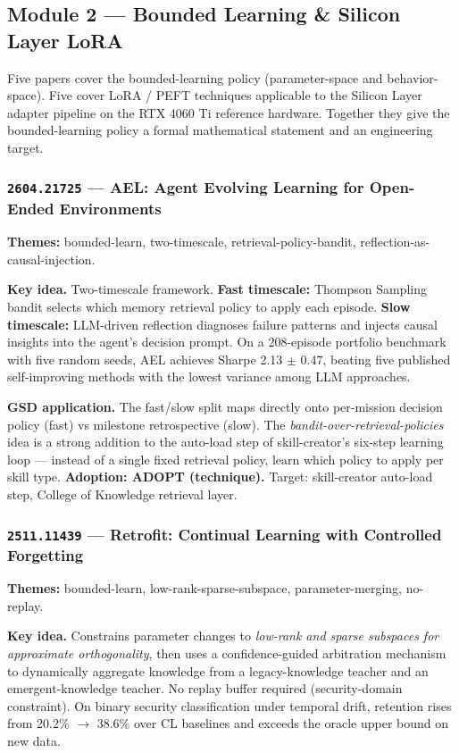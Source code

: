 \documentclass[11pt,letterpaper]{article}
\newcommand{\arxivid}[1]{\texttt{\textcolor{accent}{#1}}}
\newcommand{\paperhead}[2]{\noindent\textbf{\sffamily\textcolor{secondary}{#1}} \textemdash{} #2}
\begin{document}
\subsection{Module 2 --- Bounded Learning \& Silicon Layer LoRA}

Five papers cover the bounded-learning policy (parameter-space and behavior-space). Five cover LoRA / PEFT techniques applicable to the Silicon Layer adapter pipeline on the RTX 4060 Ti reference hardware. Together they give the bounded-learning policy a formal mathematical statement and an engineering target.

\subsubsection{\arxivid{2604.21725} --- AEL: Agent Evolving Learning for Open-Ended Environments}

\paperhead{Themes:}{bounded-learn, two-timescale, retrieval-policy-bandit, reflection-as-causal-injection.}

\textbf{Key idea.} Two-timescale framework. \textbf{Fast timescale:} Thompson Sampling bandit selects which memory retrieval policy to apply each episode. \textbf{Slow timescale:} LLM-driven reflection diagnoses failure patterns and injects causal insights into the agent's decision prompt. On a 208-episode portfolio benchmark with five random seeds, AEL achieves Sharpe 2.13 $\pm$ 0.47, beating five published self-improving methods with the lowest variance among LLM approaches.

\textbf{GSD application.} The fast/slow split maps directly onto per-mission decision policy (fast) vs milestone retrospective (slow). The \textit{bandit-over-retrieval-policies} idea is a strong addition to the auto-load step of skill-creator's six-step learning loop --- instead of a single fixed retrieval policy, learn which policy to apply per skill type. \textbf{Adoption: ADOPT (technique).} Target: skill-creator auto-load step, College of Knowledge retrieval layer.

\subsubsection{\arxivid{2511.11439} --- Retrofit: Continual Learning with Controlled Forgetting}

\paperhead{Themes:}{bounded-learn, low-rank-sparse-subspace, parameter-merging, no-replay.}

\textbf{Key idea.} Constrains parameter changes to \textit{low-rank and sparse subspaces for approximate orthogonality}, then uses a confidence-guided arbitration mechanism to dynamically aggregate knowledge from a legacy-knowledge teacher and an emergent-knowledge teacher. No replay buffer required (security-domain constraint). On binary security classification under temporal drift, retention rises from 20.2\% $\rightarrow$ 38.6\% over CL baselines and exceeds the oracle upper bound on new data.
\end{document}
